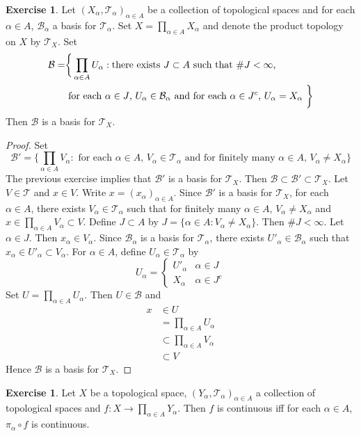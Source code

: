 \documentclass[12pt]{amsart}
\theoremstyle{definition}
\newtheorem{ex}[definition]{Exercise}
\newcommand{\al}{\alpha}
\newcommand{\MB}{\mathcal{B}}
\newcommand{\MT}{\mathcal{T}}
\DeclareMathOperator*{\0}{\mbf{0}}
\DeclareMathOperator*{\1}{\mbf{1}}
\begin{document}
	\begin{ex}
		Let $(X_{\al}, \MT_{\al})_{\al \in A}$ be a collection of topological spaces and for each $\al \in A$, $\MB_{\al}$ a basis for $\MT_{\al}$. Set $X = \prod_{\al \in A} X_{\al}$ and denote the product topology on $X$ by $\MT_X$. Set 
		\begin{align*}
			\MB = 
			& \bigg \{\prod_{\al \in A} U_{\al}: \text{there exists $J \subset A$ such that $ \# J < \infty$, } \\
			& \text{ for each $\al \in J$, $U_{\al} \in \MB_{\al}$ and for each $\al \in J^c$, $U_{\al} = X_{\al}$ } \bigg \}
		\end{align*} 
		Then $\MB$ is a basis for $\MT_X$.
	\end{ex}

	\begin{proof}
		Set 
		$$\MB' = \bigg \{\prod_{\al \in A}V_{\al}: \text{ for each $\al \in A$, } V_{\al} \in \MT_{\al} \text{ and for finitely many $\al \in A$, } V_{\al} \neq X_{\al} \bigg\}$$
		The previous exercise implies that $\MB'$ is a basis for $\MT_X$. Then $\MB \subset \MB' \subset \MT_X$. Let $V \in \MT$ and $x \in V$. Write $x = (x_{\al})_{\al \in A}$. Since $\MB'$ is a basis for $\MT_X$, for each $\al \in A$, there exists $V_{\al} \in \MT_{\al}$ such that for finitely many $\al \in A$, $V_{\al} \neq X_{\al}$ and $x \in \prod\limits_{\al \in A} V_{\al} \subset V$. Define $J \subset A$ by $J = \{\al \in A: V_{\al} \neq X_{\al}\}$. Then $\#J < \infty$. Let $\al \in J$. Then $x_{\al} \in V_{\al}$. Since $\MB_{\al}$ is a basis for $\MT_{\al}$, there exists $U'_{\al} \in \MB_{\al}$ such that $x_{\al} \in U'_{\al} \subset V_{\al}$. For $\al \in A$, define $U_{\al} \in \MT_{\al}$ by 
		\[
		U_{\al} =
		\begin{cases}
			U'_{\al} & \al \in J \\
			X_{\al} & \al \in J^c
		\end{cases}
		\]
		Set $U = \prod_{\al \in A} U_{\al}$. Then $U \in \MB$ and 
		\begin{align*}
			x 
			& \in U \\
			& = \prod_{\al \in A} U_{\al} \\
			& \subset \prod\limits_{\al \in A} V_{\al} \\
			& \subset V
		\end{align*}
		Hence $\MB$ is a basis for $\MT_X$.
	\end{proof}

	\begin{ex}
		Let $X$ be a topological space, $(Y_{\al}, \MT_{\al})_{\al \in A}$ a collection of topological spaces and $f: X \rightarrow \prod_{\al \in A}Y_{\al}$. Then $f$ is continuous iff for each $\al \in A$, $\pi_{\al} \circ f$ is continuous.
	\end{ex}
\end{document}
